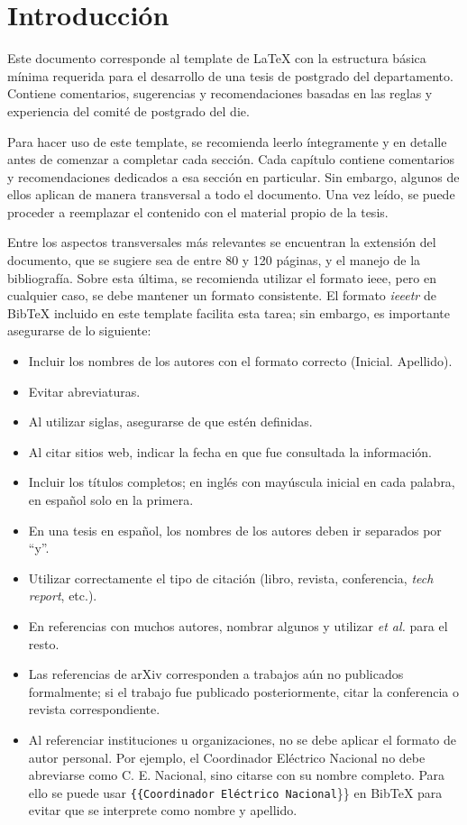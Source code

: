 \chapter{Introducción}\label{chap:Intro}

Este documento corresponde al template de \LaTeX{} con la estructura básica mínima requerida para el desarrollo de una tesis de postgrado del departamento. Contiene comentarios, sugerencias y recomendaciones basadas en las reglas y experiencia del comité de postgrado del \gls{die}.

Para hacer uso de este template, se recomienda leerlo íntegramente y en detalle antes de comenzar a completar cada sección. Cada capítulo contiene comentarios y recomendaciones dedicados a esa sección en particular. Sin embargo, algunos de ellos aplican de manera transversal a todo el documento. Una vez leído, se puede proceder a reemplazar el contenido con el material propio de la tesis.

Entre los aspectos transversales más relevantes se encuentran la extensión del documento, que se sugiere sea de entre 80 y 120 páginas, y el manejo de la bibliografía. Sobre esta última, se recomienda utilizar el formato \gls{ieee}, pero en cualquier caso, se debe mantener un formato consistente. El formato \textit{ieeetr} de BibTeX incluido en este template facilita esta tarea; sin embargo, es importante asegurarse de lo siguiente:

\begin{itemize}
    \item Incluir los nombres de los autores con el formato correcto (Inicial. Apellido).
    \item Evitar abreviaturas.
    \item Al utilizar siglas, asegurarse de que estén definidas.
    \item Al citar sitios web, indicar la fecha en que fue consultada la información.
    \item Incluir los títulos completos; en inglés con mayúscula inicial en cada palabra, en español solo en la primera.
    \item En una tesis en español, los nombres de los autores deben ir separados por ``y''.
    \item Utilizar correctamente el tipo de citación (libro, revista, conferencia, \textit{tech report}, etc.).
    \item En referencias con muchos autores, nombrar algunos y utilizar \textit{et al.} para el resto.
    \item Las referencias de arXiv corresponden a trabajos aún no publicados formalmente; si el trabajo fue publicado posteriormente, citar la conferencia o revista correspondiente.
    \item Al referenciar instituciones u organizaciones, no se debe aplicar el formato de autor personal. Por ejemplo, el Coordinador Eléctrico Nacional no debe abreviarse como C. E. Nacional, sino citarse con su nombre completo. Para ello se puede usar  \texttt{\{\{Coordinador Eléctrico Nacional}\}\} en BibTeX para evitar que se interprete como nombre y apellido.
\end{itemize}

